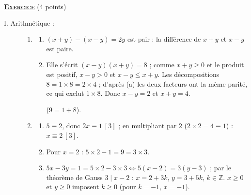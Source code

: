 \providecommand{\cm}{~\mathrm{cm}}
\providecommand{\dx}{~\mathrm{d}x}
\providecommand{\Courben}{(\mathscr{C}_n)}
\providecommand{\CourbeU}{(\mathscr{C}_1)}
\providecommand{\CourbeD}{(\mathscr{C}_2)}
\providecommand{\Angl}[2]{\left( \overrightarrow{#1} ; \overrightarrow{#2} \right)}
%
\noindent \underline{\textsc{\textbf{Exercice}}} (4 points)
\begin{description}
	\item[I. Arithmétique :]
	\begin{enumerate}
		\item
		\begin{enumerate}
			\item {}
				$(x + y) - (x - y) = 2y$ est pair : la différence de $x + y$ et $x - y$ est paire.
				\par\noindent{}
			\item {}
				Elle s'écrit $(x - y)(x + y) = 8$ ; comme $x + y \geq 0$ et le produit est positif, $x - y > 0$ et $x - y \leq x + y$.
				Les décompositions $8 = 1 \times 8 = 2 \times 4$ ; d'après (a) les deux facteurs ont la même parité, ce qui exclut $1 \times 8$.
				Donc $x - y = 2$ et $x + y = 4$.
				\par\noindent{} ($9 = 1 + 8$).
		\end{enumerate}
		\item
		\begin{enumerate}
			\item {}
				$5 \equiv 2$, donc $2x \equiv 1 \ [3]$ ; en multipliant par $2$ ($2 \times 2 = 4 \equiv 1$) : $x \equiv 2 \ [3]$.
				\par\noindent{}
			\item {}
				Pour $x = 2$ : $5 \times 2 - 1 = 9 = 3 \times 3$. \par\noindent{}
			\item {}
				$5x - 3y = 1 = 5 \times 2 - 3 \times 3 \iff 5(x - 2) = 3(y - 3)$ ; par le théorème de Gauss $3 \mid x - 2$ : $x = 2 + 3k$, $y = 3 + 5k$, $k \in \mathbb{Z}$.
				$x \geq 0$ et $y \geq 0$ imposent $k \geq 0$ (pour $k = -1$, $x = -1$).

\end{enumerate}
\end{enumerate}
\end{description}
